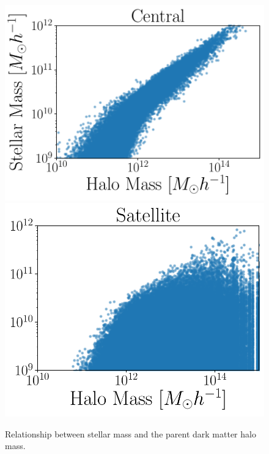 \documentclass[a4paper,fleqn,usenatbib]{mnras}
\begin{document}
\begin{figure}
    \centering
     \includegraphics[width=1\columnwidth]{figuras/CH.pdf}
    \includegraphics[width=0.9\columnwidth]{figuras/SH.pdf}
    \caption{Relationship between stellar mass and the parent dark matter halo mass.}
    \label{fig:stellar_to_halo}
\end{figure}
\end{document}
